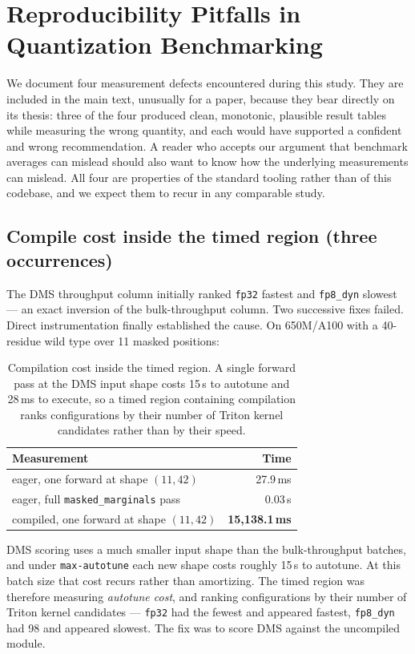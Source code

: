 \documentclass[11pt]{article}
\newcommand{\cfg}[1]{\texttt{#1}}
\newcommand{\best}[1]{\textbf{#1}}
\begin{document}
\section{Reproducibility Pitfalls in Quantization Benchmarking}
\label{sec:pitfalls}

We document four measurement defects encountered during this study. They are
included in the main text, unusually for a paper, because they bear directly on
its thesis: three of the four produced clean, monotonic, plausible result tables
while measuring the wrong quantity, and each would have supported a confident and
wrong recommendation. A reader who accepts our argument that benchmark averages
can mislead should also want to know how the underlying measurements can
mislead. All four are properties of the standard tooling rather than of this
codebase, and we expect them to recur in any comparable study.

\subsection{Compile cost inside the timed region (three occurrences)}

The DMS throughput column initially ranked \cfg{fp32} fastest and \cfg{fp8\_dyn}
slowest --- an exact inversion of the bulk-throughput column. Two successive
fixes failed. Direct instrumentation finally established the cause. On
650M/A100 with a 40-residue wild type over 11 masked positions:

\begin{table}[htb]
\centering
\caption{Compilation cost inside the timed region. A single forward pass at the DMS input shape costs 15\,s to autotune and 28\,ms to execute, so a timed region containing compilation ranks configurations by their number of Triton kernel candidates rather than by their speed.}
\small
\begin{tabular}{lr}
\toprule
Measurement & Time \\
\midrule
eager, one forward at shape $(11, 42)$        & 27.9\,ms \\
eager, full \texttt{masked\_marginals} pass   & 0.03\,s \\
compiled, one forward at shape $(11, 42)$     & \best{15{,}138.1\,ms} \\
\bottomrule
\end{tabular}
\end{table}

DMS scoring uses a much smaller input shape than the bulk-throughput batches,
and under \texttt{max-autotune} each new shape costs roughly 15\,s to autotune.
At this batch size that cost recurs rather than amortizing. The timed region was
therefore measuring \emph{autotune cost}, and ranking configurations by their
number of Triton kernel candidates --- \cfg{fp32} had the fewest and appeared
fastest, \cfg{fp8\_dyn} had 98 and appeared slowest. The fix was to score DMS
against the uncompiled module.
\end{document}
